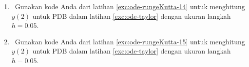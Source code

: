 \begin{small}
\begin{enumerate}
\ref{exc:ode-rungeKutta-13} untuk menghitung $y(2)$ untuk PDB dalam
latihan \ref{exc:ode-taylor}  dengan ukuran
langkah $h=0.05$.  \haspartwithsolution  \haspartwithanswer 
\item \octave\ \label{exc:ode-rungeKutta-20}Gunakan kode Anda dari latihan
\ref{exc:ode-rungeKutta-14} untuk menghitung $y(2)$ untuk PDB dalam
latihan \ref{exc:ode-taylor}  dengan ukuran
langkah $h=0.05$.  \haspartwithsolution  \haspartwithanswer 
\item \octave\ \label{exc:ode-rungeKutta-21}Gunakan kode Anda dari latihan
\ref{exc:ode-rungeKutta-15} untuk menghitung $y(2)$ untuk PDB dalam
latihan \ref{exc:ode-taylor}  dengan ukuran
langkah $h=0.05$.  \haspartwithsolution  \haspartwithanswer 
\end{enumerate}
\noindent\end{small} 

